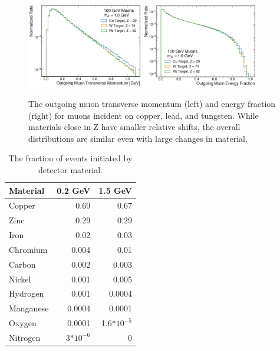 \begin{figure}[!htbp]
    \centering
    \includegraphics[width=0.45\textwidth]{figures/muon_material_comp_pt.pdf}
    \hspace{0.01\textwidth}
    \includegraphics[width=0.45\textwidth]{figures/muon_material_comp_efrac.pdf}
    \caption[
        Material dependence of \dbrem kinematics.
    ]{
        The outgoing muon transverse momentum (left) and energy fraction (right) for muons incident on copper, lead, and tungsten. While materials close in Z have smaller relative shifts, the overall distributions are similar even with large changes in material. 
    }
    \label{fig:dbrem_material}
\end{figure}

\begin{table}[h]
    \centering
    \begin{center}
        \begin{tabular}{@{}l rr@{}}
            \toprule
            Material & 0.2 GeV & 1.5 GeV\\
            \midrule
            Copper&0.69&0.67\\
            Zinc&0.29&0.29\\
            Iron&0.02&0.03\\
            Chromium&0.004&0.01\\
            Carbon&0.002&0.003\\
            Nickel&0.001&0.005\\
            Hydrogen&0.001&0.0004\\
            Manganese&0.0004&0.0001\\
            Oxygen&0.0001&1.6$*10^{-5}$\\
            Nitrogen&3$*10^{-6}$&0\\
            \bottomrule
        \end{tabular}
        \caption{
            The fraction of \dbrem events initiated by detector material.
        }
        \label{table:dbrem_material}
    \end{center}
\end{table}
    
